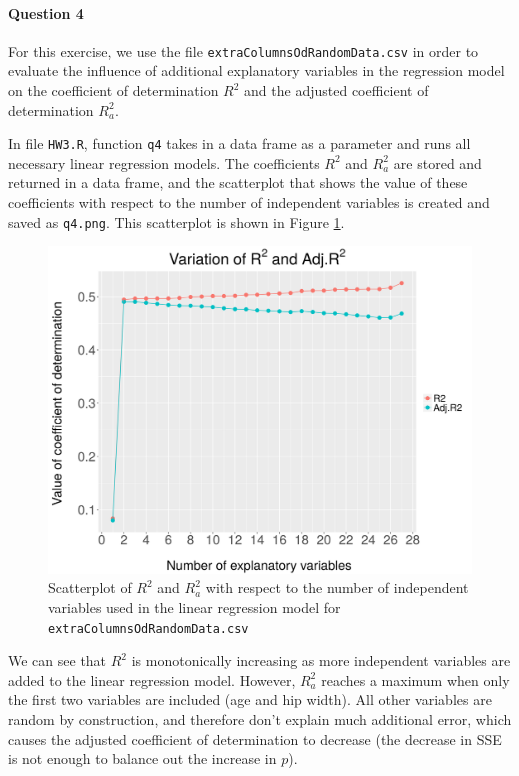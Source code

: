 \documentclass[]{article}
\let\oldparagraph\paragraph
\renewcommand{\paragraph}[1]{\oldparagraph{#1}\mbox{}}
\begin{document}
\paragraph{\Large Question 4}\normalsize

For this exercise, we use the file \texttt{extraColumnsOdRandomData.csv} in order to evaluate the influence of additional explanatory variables in the regression model on the coefficient of determination $R^2$ and the adjusted coefficient of determination $R^2_a$.

In file \texttt{HW3.R}, function \texttt{q4} takes in a data frame as a parameter and runs all necessary linear regression models. The coefficients $R^2$ and $R^2_a$ are stored and returned in a data frame, and the scatterplot that shows the value of these coefficients with respect to the number of independent variables is created and saved as \texttt{q4.png}. This scatterplot is shown in Figure \ref{fig4}.

\begin{figure}[!ht]
\centering
\includegraphics[width=\linewidth]{q4.png}
\caption{Scatterplot of $R^2$ and $R^2_a$ with respect to the number of independent variables used in the linear regression model for \texttt{extraColumnsOdRandomData.csv}}
\label{fig4}
\end{figure}

We can see that $R^2$ is monotonically increasing as more independent variables are added to the linear regression model. However, $R^2_a$ reaches a maximum when only the first two variables are included (age and hip width). All other variables are random by construction, and therefore don't explain much additional error, which causes the adjusted coefficient of determination to decrease (the decrease in SSE is not enough to balance out the increase in $p$). 
\end{document}

